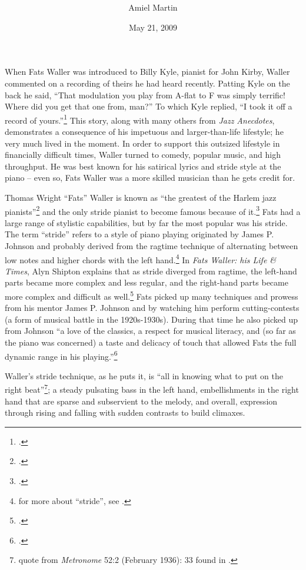 \documentclass[11pt]{report}
\title{\fattitle \\
		\large \fatslogan}
\author{Amiel Martin}
\date{May 21, 2009}
\begin{document}
	\maketitle

	\label{sec:introduction}
	When Fats Waller was introduced to Billy Kyle, pianist for John Kirby, Waller commented on a recording of theirs he had heard recently. Patting Kyle on the back he said, ``That modulation you play from A-flat to F was simply terrific! Where did you get that one from, man?'' To which Kyle replied, ``I took it off a record of yours.''\footnote{\cite[231]{anecdotes}.} This story, along with many others from \emph{Jazz Anecdotes}, demonstrates a consequence of his impetuous and larger-than-life lifestyle; he very much lived in the moment. In order to support this outsized lifestyle in financially difficult times, Waller turned to comedy, popular music, and high throughput. He was best known for his satirical lyrics and stride style at the piano -- even so, Fats Waller was a more skilled musician than he gets credit for.

	\label{sec:piano_skills}
	Thomas Wright ``Fats'' Waller is known as ``the greatest of the Harlem jazz pianists''\footnote{\cite[2]{life}.} and the only stride pianist to become famous because of it.\footnote{\cite[146]{visions}.} Fats had a large range of stylistic capabilities, but by far the most popular was his stride. The term ``stride'' refers to a style of piano playing originated by James P. Johnson and probably derived from the ragtime technique of alternating between low notes and higher chords with the left hand.\footnote{for more about ``stride'', see \cite[79]{experience}.} In \emph{Fats Waller: his Life \& Times}, Alyn Shipton explains that as stride diverged from ragtime, the left-hand parts became more complex and less regular, and the right-hand parts became more complex and difficult as well.\footnote{\cite[5]{life}.} Fats picked up many techniques and prowess from his mentor James P. Johnson and by watching him perform cutting-contests (a form of musical battle in the 1920s-1930s). During that time he also picked up from Johnson ``a love of the classics, a respect for musical literacy, and (so far as the piano was concerned) a taste and delicacy of touch that allowed Fats the full dynamic range in his playing.''\footnote{\cite[8]{life}.}
	
	Waller's stride technique, as he puts it, is ``all in knowing what to put on the right beat''\footnote{quote from \emph{Metronome} 52:2 (February 1936): 33 found in \cite{transcriptions}.}; a steady pulsating bass in the left hand, embellishments in the right hand that are sparse and subservient to the melody, and overall, expression through rising and falling with sudden contrasts to build climaxes.
	
\end{document}
